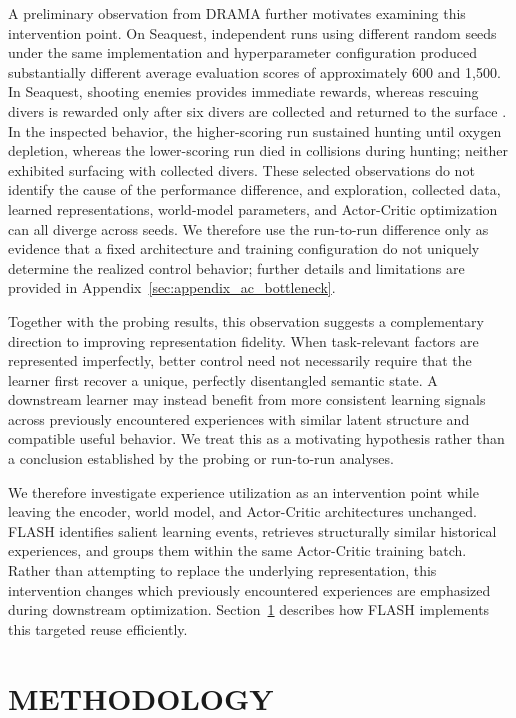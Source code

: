 \documentclass{article} %
\begin{document}
A preliminary observation from DRAMA \citep{wang2025drama} further motivates examining this intervention point. On Seaquest, independent runs using different random seeds under the same implementation and hyperparameter configuration produced substantially different average evaluation scores of approximately 600 and 1,500. In Seaquest, shooting enemies provides immediate rewards, whereas rescuing divers is rewarded only after six divers are collected and returned to the surface \citep{zahavy2016graying}. In the inspected behavior, the higher-scoring run sustained hunting until oxygen depletion, whereas the lower-scoring run died in collisions during hunting; neither exhibited surfacing with collected divers. These selected observations do not identify the cause of the performance difference, and exploration, collected data, learned representations, world-model parameters, and Actor-Critic optimization can all diverge across seeds. We therefore use the run-to-run difference only as evidence that a fixed architecture and training configuration do not uniquely determine the realized control behavior; further details and limitations are provided in Appendix~\ref{sec:appendix_ac_bottleneck}.

Together with the probing results, this observation suggests a complementary direction to improving representation fidelity. When task-relevant factors are represented imperfectly, better control need not necessarily require that the learner first recover a unique, perfectly disentangled semantic state. A downstream learner may instead benefit from more consistent learning signals across previously encountered experiences with similar latent structure and compatible useful behavior. We treat this as a motivating hypothesis rather than a conclusion established by the probing or run-to-run analyses.

We therefore investigate experience utilization as an intervention point while leaving the encoder, world model, and Actor-Critic architectures unchanged. FLASH identifies salient learning events, retrieves structurally similar historical experiences, and groups them within the same Actor-Critic training batch. Rather than attempting to replace the underlying representation, this intervention changes which previously encountered experiences are emphasized during downstream optimization. Section~\ref{sec:method} describes how FLASH implements this targeted reuse efficiently.


\section{METHODOLOGY}
\label{sec:method}
\end{document}
